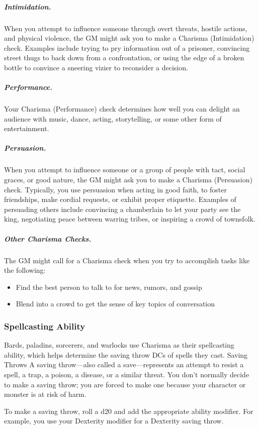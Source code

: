 \subparagraph*{Intimidation.} When you attempt to influence someone through overt threats, hostile actions, and physical violence, the GM might ask you to make a Charisma (Intimidation) check. Examples include trying to pry information out of a prisoner, convincing street thugs to back down from a confrontation, or using the edge of a broken bottle to convince a sneering vizier to reconsider a decision.

\subparagraph*{Performance.} Your Charisma (Performance) check determines how well you can delight an audience with music, dance, acting, storytelling, or some other form of entertainment.

\subparagraph*{Persuasion.} When you attempt to influence someone or a group of people with tact, social graces, or good nature, the GM might ask you to make a Charisma (Persuasion) check. Typically, you use persuasion when acting in good faith, to foster friendships, make cordial requests, or exhibit proper etiquette. Examples of persuading others include convincing a chamberlain to let your party see the king, negotiating peace between warring tribes, or inspiring a crowd of townsfolk.

\subparagraph*{Other Charisma Checks.} The GM might call for a Charisma check when you try to accomplish tasks like the following:

\begin{itemize}
    \item Find the best person to talk to for news, rumors, and gossip
    \item Blend into a crowd to get the sense of key topics of conversation
\end{itemize}

\subsubsection{Spellcasting Ability}

Bards, paladins, sorcerers, and warlocks use Charisma as their spellcasting ability, which helps determine the saving throw DCs of spells they cast.
Saving Throws
A saving throw—also called a save—represents an attempt to resist a spell, a trap, a poison, a disease, or a similar threat. You don't normally decide to make a saving throw; you are forced to make one because your character or monster is at risk of harm.

To make a saving throw, roll a d20 and add the appropriate ability modifier. For example, you use your Dexterity modifier for a Dexterity saving throw.

